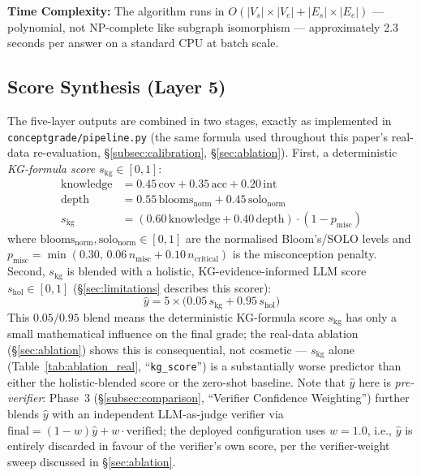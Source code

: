 \documentclass[conference]{IEEEtran}
\begin{document}
\textbf{Time Complexity:} The algorithm runs in $O(|V_s| \times |V_e| +
|E_s| \times |E_e|)$ --- polynomial, not NP-complete like subgraph
isomorphism --- approximately 2.3 seconds per answer on a standard CPU
at batch scale.

\subsection{Score Synthesis (Layer 5)}
\label{subsec:synthesis}

The five-layer outputs are combined in two stages, exactly as
implemented in \texttt{conceptgrade/pipeline.py} (the same formula used
throughout this paper's real-data re-evaluation,
\S\ref{subsec:calibration}, \S\ref{sec:ablation}). First, a deterministic
\emph{KG-formula score} $s_{\text{kg}} \in [0,1]$:
\begin{align}
  \text{knowledge} &= 0.45\,\text{cov} + 0.35\,\text{acc} + 0.20\,\text{int} \nonumber \\
  \text{depth} &= 0.55\,\text{blooms}_{\text{norm}} + 0.45\,\text{solo}_{\text{norm}} \nonumber \\
  s_{\text{kg}} &= (0.60\,\text{knowledge} + 0.40\,\text{depth})\cdot(1 - p_{\text{misc}})
  \label{eq:kgformula}
\end{align}
where $\text{blooms}_{\text{norm}}, \text{solo}_{\text{norm}} \in [0,1]$
are the normalised Bloom's/SOLO levels and $p_{\text{misc}} =
\min(0.30,\, 0.06\,n_{\text{misc}} + 0.10\,n_{\text{critical}})$ is the
misconception penalty. Second, $s_{\text{kg}}$ is blended with a
holistic, KG-evidence-informed LLM score $s_{\text{hol}} \in [0,1]$
(\S\ref{sec:limitations} describes this scorer):
\begin{equation}
  \hat{y} = 5 \times \bigl(0.05\,s_{\text{kg}} + 0.95\,s_{\text{hol}}\bigr)
  \label{eq:composite}
\end{equation}
This $0.05/0.95$ blend means the deterministic KG-formula score
$s_{\text{kg}}$ has only a small mathematical influence on the final
grade; the real-data ablation (\S\ref{sec:ablation}) shows this is
consequential, not cosmetic --- $s_{\text{kg}}$ alone (Table~\ref{tab:ablation_real}, ``\texttt{kg\_score}'')
is a substantially worse predictor than either the holistic-blended
score or the zero-shot baseline. Note that $\hat{y}$ here is
\emph{pre-verifier}: Phase~3 (\S\ref{subsec:comparison}, ``Verifier
Confidence Weighting'') further blends $\hat{y}$ with an independent
LLM-as-judge verifier \cite{zheng2023llmjudge} via
$\text{final} = (1-w)\hat{y} + w\cdot\text{verified}$;
the deployed configuration uses $w=1.0$, i.e., $\hat{y}$ is entirely
discarded in favour of the verifier's own score, per the verifier-weight
sweep discussed in \S\ref{sec:ablation}.
\end{document}

